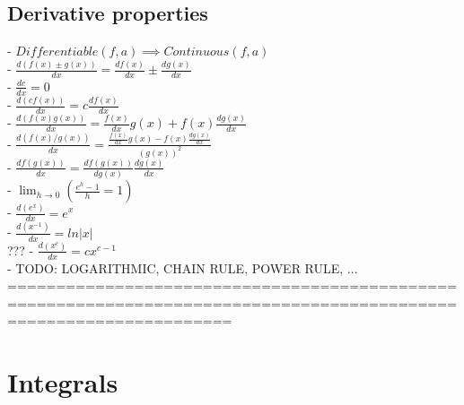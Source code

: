 \documentclass{book}
\begin{document}
\subsection{Derivative properties} %
	- $Differentiable(f, a) \implies Continuous(f, a)$ \\
	- $\frac{d(f(x) \pm g(x))}{dx} = \frac{df(x)}{dx} \pm \frac{dg(x)}{dx}$ \\
	- $\frac{dc}{dx} = 0$ \\
	- $\frac{d(c f(x))}{dx} = c \frac{df(x)}{dx}$ \\
	- $\frac{d(f(x) g(x))}{dx} = \frac{f(x)}{dx} g(x) + f(x) \frac{dg(x)}{dx}$ \\
	- $\frac{d(f(x) / g(x))}{dx} =  \frac{\frac{f(x)}{dx} g(x) - f(x) \frac{dg(x)}{dx}}{(g(x))^2}$ \\
	- $\frac{df(g(x))}{dx} = \frac{df(g(x))}{dg(x)} \frac{dg(x)}{dx}$ \\ %
	- $\lim_{h \to 0} (\frac{e^h - 1}{h} = 1)$ \\
	- $\frac{d(e^x)}{dx} = e^x$ \\ %
	- $\frac{d(x^{-1})}{dx} = ln|x|$ \\ ???
	- $\frac{d(x^c)}{dx} = c x^{c-1}$ \\ %
	- TODO: LOGARITHMIC, CHAIN RULE, POWER RULE, ...
	===================================================================================================================
\section{Integrals}
\end{document}
